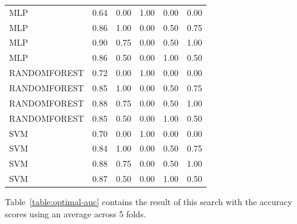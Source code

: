 \documentclass[letterpaper]{article}
\begin{document}
{\begin{small}
{\begin{longtable}{lrrrrr}
         MLP & 0.64 &      0.00 & 1.00 &       0.00 &       0.00 \\
         MLP & 0.86 &      1.00 & 0.00 &       0.50 &       0.75 \\
         MLP & 0.90 &      0.75 & 0.00 &       0.50 &       1.00 \\
         MLP & 0.86 &      0.50 & 0.00 &       1.00 &       0.50 \\
RANDOMFOREST & 0.72 &      0.00 & 1.00 &       0.00 &       0.00 \\
RANDOMFOREST & 0.85 &      1.00 & 0.00 &       0.50 &       0.75 \\
RANDOMFOREST & 0.88 &      0.75 & 0.00 &       0.50 &       1.00 \\
RANDOMFOREST & 0.85 &      0.50 & 0.00 &       1.00 &       0.50 \\
         SVM & 0.70 &      0.00 & 1.00 &       0.00 &       0.00 \\
         SVM & 0.84 &      1.00 & 0.00 &       0.50 &       0.75 \\
         SVM & 0.88 &      0.75 & 0.00 &       0.50 &       1.00 \\
         SVM & 0.87 &      0.50 & 0.00 &       1.00 &       0.50 \\
\end{longtable}




}
\end{small}
Table~\ref{table:optimal-auc} contains the result of this search with the accuracy scores using an average across 5 folds.

}
\end{document}
